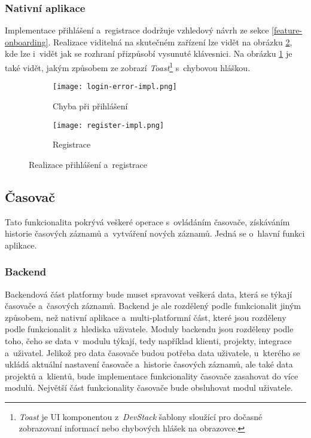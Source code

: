 \subsubsection{Nativní aplikace}

Implementace přihlášení a~registrace dodržuje vzhledový návrh ze sekce \ref{feature-onboarding}. Realizace viditelná na skutečném zařízení lze vidět na obrázku \ref{fig:onboarding-impl}, kde lze i~vidět jak se rozhraní přizpůsobí vysunuté klávesnici. Na obrázku \ref{fig:login-error-impl} je také vidět, jakým způsobem ze zobrazí \emph{Toast}\footnote{\emph{Toast} je UI komponentou z~\emph{DevStack} šablony sloužící pro dočasné zobrazovaní informací nebo chybových hlášek na obrazovce.} s~chybovou hláškou.

\begin{figure}[h]
    \centering
    \begin{subfigure}[b]{0.4\textwidth}
		\centering
		\texttt{[image: login-error-impl.png]}
		\caption{Chyba při přihlášení}
		\label{fig:login-error-impl}
	\end{subfigure}
	\hspace{2cm}
	\begin{subfigure}[b]{0.4\textwidth}
		\centering
		\texttt{[image: register-impl.png]}
		\caption{Registrace}
	\end{subfigure}
	\caption{Realizace přihlášení a~registrace}
	\label{fig:onboarding-impl}
\end{figure}

\subsection{Časovač}

Tato funkcionalita pokrývá veškeré operace s~ovládáním časovače, získáváním historie časových záznamů a~vytváření nových záznamů. Jedná se o~hlavní funkci aplikace.

\subsubsection{Backend}

Backendová část platformy bude muset spravovat veškerá data, která se týkají časovače a~časových záznamů. Backend je ale rozdělený podle funkcionalit jiným způsobem, než nativní aplikace a~multi-platformní část, které jsou rozděleny podle funkcionalit z~hlediska uživatele. Moduly backendu jsou rozděleny podle toho, čeho se data v~modulu týkají, tedy například klienti, projekty, integrace a~uživatel. Jelikož pro data časovače budou potřeba data uživatele, u~kterého se ukládá aktuální nastavení časovače a~historie časových záznamů, ale také data projektů a~klientů, bude implementace funkcionality časovače zasahovat do více modulů. Největší část funkcionality časovače bude obsluhovat modul uživatele. 


